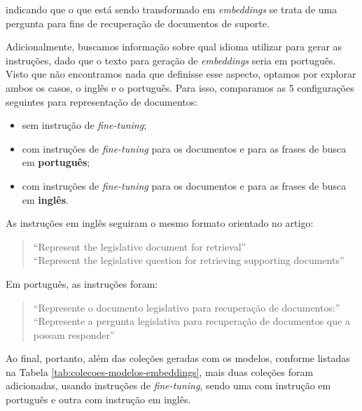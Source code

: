 indicando que o que está sendo transformado em \textit{embeddings} se trata de uma pergunta para fins de recuperação de documentos de suporte.

Adicionalmente, buscamos informação sobre qual idioma utilizar para gerar as instruções, dado que o texto para geração de \textit{embeddings} seria em português. Visto que não encontramos nada que definisse esse aspecto, optamos por explorar ambos os casos, o inglês e o português. Para isso, comparamos as 5 configurações seguintes para representação de documentos:

\begin{itemize}
    \item sem instrução de \textit{fine-tuning};
    \item com instruções de \textit{fine-tuning} para os documentos e para as frases de busca em \textbf{português};
    \item com instruções de \textit{fine-tuning} para os documentos e para as frases de busca em \textbf{inglês}.
\end{itemize}

As instruções em inglês seguiram o mesmo formato orientado no artigo:

\begin{quote}
{
\footnotesize
\ttfamily
    ``Represent the legislative document for retrieval'' \\
    ``Represent the legislative question for retrieving supporting documents''
}
\end{quote}

Em português, as instruções foram:

\begin{quote}
{
    \begin{minipage}{\dimexpr\linewidth-2em}
    \setlength{\rightskip}{0.7em}
    \footnotesize
    \ttfamily

    ``Represente o documento legislativo para recuperação de documentos:'' \\
    ``Represente a pergunta legislativa para recuperação de documentos que a possam responder''
    \end{minipage}
}
\end{quote}

Ao final, portanto, além das coleções geradas com os modelos, conforme listadas na Tabela \ref{tab:colecoes-modelos-embeddings}, mais duas coleções foram adicionadas, usando instruções de \textit{fine-tuning}, sendo uma com instrução em português e outra com instrução em inglês.


